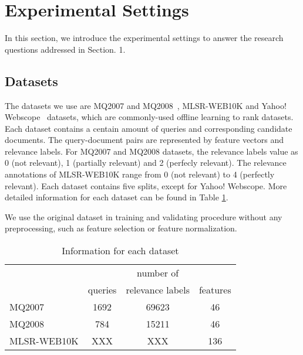 \section{Experimental Settings}

In this section, we introduce the experimental settings to answer the research questions addressed in Section. 1.

\subsection{Datasets}
The datasets we use are MQ2007 and MQ2008~\cite{DBLP:journals/corr/QinL13}, MLSR-WEB10K\cite{DBLP:journals/corr/QinL13} and Yahoo! Webscope~\cite{DBLP:journals/jmlr/ChapelleC11} datasets, which are commonly-used offline learning to rank datasets. Each dataset contains a centain amount of queries and corresponding candidate documents. The query-document pairs are represented by feature vectors and relevance labels. For MQ2007 and MQ2008 datasets, the relevance labels value as 0 (not relevant), 1 (partially relevant) and 2 (perfecly relevant). The relevance annotations of MLSR-WEB10K range from 0 (not relevant) to 4 (perfectly relevant). Each dataset contains five splits, except for Yahoo! Webscope. More detailed information for each dataset can be found in Table \ref{table:1:dataset}.

We use the original dataset in training and validating procedure without any preprocessing, such as feature selection or feature normalization.

\begin{table}
	\caption{Information for each dataset}
	\label{table:1:dataset}
	\centering
	\begin{tabular}{l c c c}
		\hline
		& & number of & \\
		& queries&  relevance labels  & features \\
		\midrule
		MQ2007  &   1692  &    69623  &    46    \\
		MQ2008  &  784  &   15211  &    46    \\
		MLSR-WEB10K  &   XXX &   XXX  &    136  \\
		\hline
	\end{tabular}
\end{table}

